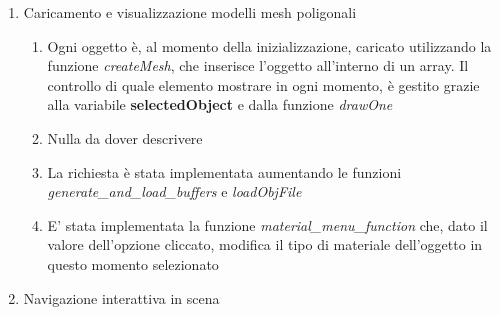 \begin{enumerate}
    \item Caricamento e visualizzazione modelli mesh poligonali
    \begin{enumerate}
        \item Ogni oggetto è, al momento della inizializzazione, caricato utilizzando la funzione \textit{createMesh}, che inserisce l'oggetto all'interno di un array. Il controllo di quale elemento mostrare in ogni momento, è gestito grazie alla variabile \textbf{selectedObject} e dalla funzione \textit{drawOne}
        \item Nulla da dover descrivere
        \item  La richiesta è stata implementata aumentando le funzioni \textit{generate\_and\_load\_buffers} e \textit{loadObjFile}
        \item E' stata implementata la funzione \textit{material\_menu\_function} che, dato il valore dell'opzione cliccato,
        modifica il tipo di materiale dell'oggetto in questo momento selezionato
    \end{enumerate}
    \item Navigazione interattiva in scena
    \begin{enumerate}
    

\end{enumerate}
\end{enumerate}
